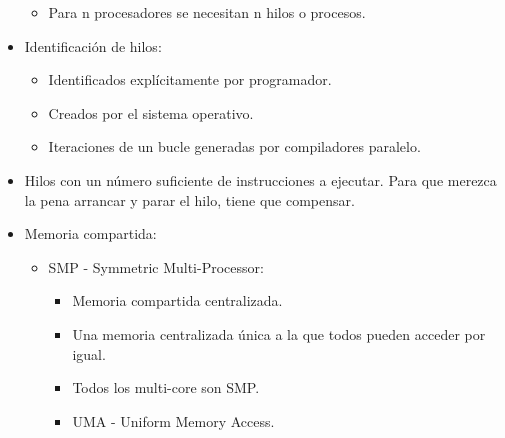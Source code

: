 \documentclass[12pt, twoside, openright]{report} %
\begin{document}
\begin{itemize}
      \begin{itemize}
      
      \item
        Para n procesadores se necesitan n hilos o procesos.
      \end{itemize}
    \item
      Identificación de hilos:

      \begin{itemize}
      
      \item
        Identificados explícitamente por programador.
      \item
        Creados por el sistema operativo.
      \item
        Iteraciones de un bucle generadas por compiladores paralelo.
      \end{itemize}
    \item
      Hilos con un número suficiente de instrucciones a ejecutar. Para
      que merezca la pena arrancar y parar el hilo, tiene que
      compensar.
    \item
      Memoria compartida:

      \begin{itemize}
      
      \item  SMP - Symmetric Multi-Processor:

        \begin{itemize}
          \item Memoria compartida centralizada.

          \item Una memoria centralizada única a la que todos pueden acceder
          por igual.
        
          \item Todos los multi-core son SMP.

          \item UMA - Uniform Memory Access.
          

\end{itemize}
\end{itemize}
\end{itemize}
\end{document}
